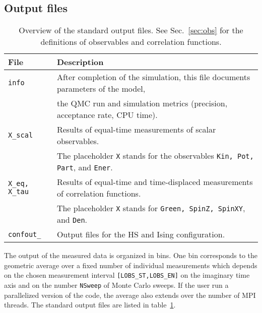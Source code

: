 \subsection{Output files} \label{sec:output}
%
\begin{table}[h]
   \begin{tabular}{l l}
   File & Description \\\hline
   \texttt{info} & After completion of the simulation, this file documents parameters of the  model,\\
   & the QMC run and simulation metrics (precision, acceptance rate, CPU time).\\
   \texttt{X\_scal} & Results of equal-time measurements of scalar observables. \\
   & The placeholder \texttt{X} stands for the observables \texttt{Kin, Pot, Part}, and \texttt{Ener}. \\
   \texttt{X\_eq, X\_tau} & Results of equal-time and time-displaced measurements of correlation functions. \\
   & The placeholder \texttt{X} stands for \texttt{Green, SpinZ, SpinXY}, and \texttt{Den}. \\   
   \texttt{confout\_<thread number>} & Output files for the HS and Ising configuration. 
   \end{tabular}
   \caption{Overview of the standard output files. 
  See Sec.~\ref{sec:obs} for the definitions of observables and correlation functions. \label{table:output}}
\end{table}
%
The output of the measured data is organized in bins. One bin corresponds to the geometric average over a fixed number of individual measurements which depends 
on the chosen measurement interval \texttt{[LOBS\_ST,LOBS\_EN]} on the imaginary time axis and on the number \texttt{NSweep} of Monte Carlo sweeps. If the user run a parallelized version of the code, the average also extends 
over the number of MPI threads. 
The standard output files are listed in table~\ref{table:output}. 

